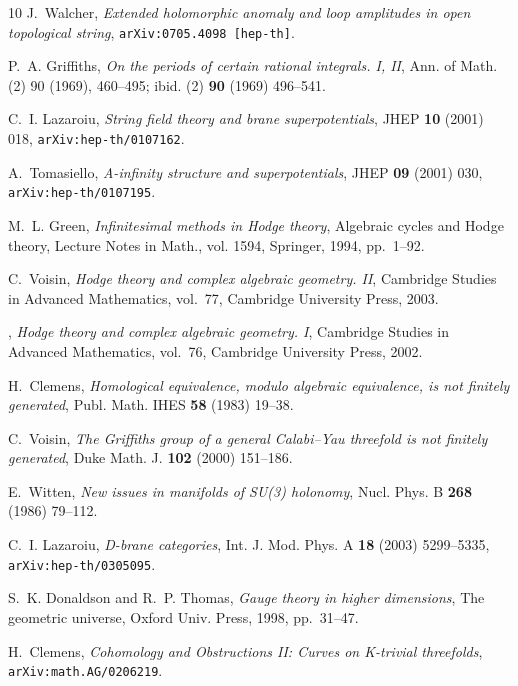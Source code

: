 \begin{thebibliography}{10}
J.~Walcher, {\em Extended holomorphic anomaly and loop amplitudes in open
  topological string}, {\tt arXiv:0705.4098 [hep-th]}.

P.~A. Griffiths, {\em On the periods of certain rational integrals. {I}, {II}},
  Ann. of Math. (2) 90 (1969), 460--495; ibid. (2) {\bf 90} (1969) 496--541.

C.~I. Lazaroiu, {\em String field theory and brane superpotentials}, JHEP {\bf
  10} (2001) 018, {\tt arXiv:hep-th/0107162}.

A.~Tomasiello, {\em A-infinity structure and superpotentials}, JHEP {\bf 09}
  (2001) 030, {\tt arXiv:hep-th/0107195}.

M.~L. Green, {\em Infinitesimal methods in {H}odge theory}, Algebraic cycles
  and Hodge theory, Lecture Notes in Math., vol. 1594, Springer, 1994,
  pp.~1--92.

C.~Voisin, {\em Hodge theory and complex algebraic geometry. {II}}, Cambridge
  Studies in Advanced Mathematics, vol.~77, Cambridge University Press, 2003.

\bysame, {\em Hodge theory and complex algebraic geometry. {I}}, Cambridge
  Studies in Advanced Mathematics, vol.~76, Cambridge University Press, 2002.

H.~Clemens, {\em Homological equivalence, modulo algebraic equivalence, is not
  finitely generated}, Publ. Math. IHES {\bf 58} (1983) 19--38.

C.~Voisin, {\em The {G}riffiths group of a general {C}alabi--{Y}au threefold is
  not finitely generated}, Duke Math. J. {\bf 102} (2000) 151--186.

E.~Witten, {\em New issues in manifolds of {SU(3)} holonomy}, Nucl. Phys. B
  {\bf 268} (1986) 79--112.

C.~I. Lazaroiu, {\em D-brane categories}, Int. J. Mod. Phys. A {\bf 18} (2003)
  5299--5335, {\tt arXiv:hep-th/0305095}.

S.~K. Donaldson and R.~P. Thomas, {\em Gauge theory in higher dimensions}, The
  geometric universe, Oxford Univ. Press, 1998, pp.~31--47.

H.~Clemens, {\em {Cohomology and Obstructions II: Curves on K-trivial
  threefolds}}, {\tt arXiv:math.AG/0206219}.


\end{thebibliography}
